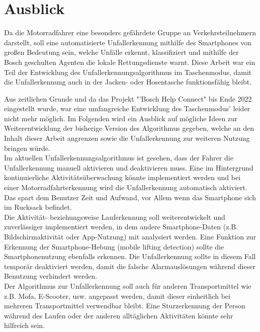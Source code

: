 \chapter{Ausblick}

Da die Motorradfahrer eine besonders gefährdete Gruppe an Verkehrsteilnehmern darstellt, soll eine automatisierte Unfallerkennung mithilfe des Smartphones von großen Bedeutung sein, welche Unfälle erkennt, klassifiziert und mithilfe der Bosch geschulten Agenten die lokale Rettungsdienste warnt. Diese Arbeit war ein Teil der Entwicklung des Unfallerkennungsalgorithmus im Taschenmodus, damit die Unfallerkennung auch in der Jacken- oder Hosentasche funktionsfähig bleibt.

Aus zeitlichen Grunde und da das Projekt "'Bosch Help Connect" bis Ende 2022 eingestellt wurde, war eine umfangreiche Entwicklung des Taschenmodus' leider nicht mehr möglich.
Im Folgenden wird ein Ausblick auf mögliche Ideen zur Weiterentwicklung der bisherige Version des Algorithmus gegeben, welche an den Inhalt dieser Arbeit angrenzen sowie die Unfallerkennung zur weiteren Nutzung bringen würde.\\

Im aktuellen Unfallerkennungsalgorithmus ist gesehen, dass der Fahrer die Unfallerkennung manuell aktivieren und deaktivieren muss. Eine im Hintergrund kontinuierliche Aktivitätsüberwachung könnte implementiert werden und bei einer Motorradfahrterkennung wird die Unfallerkennung automatisch aktiviert. Das spart dem Benutzer Zeit und Aufwand, vor Allem wenn das Smartphone sich im Rucksack befindet.\\ %

Die Aktivität- beziehungsweise Lauferkennung soll weiterentwickelt und zuverlässiger implementiert werden, in dem andere Smartphone-Daten (z.B. Bildschirmaktivität oder App-Nutzung) mit analysiert werden.
Eine Funktion zur Erkennung der Smartphone-Hebung (mobile lifting detection) sollte die Smartphonenutzung ebenfalls erkennen. Die Unfallerkennung sollte in diesem Fall temporär deaktiviert werden, damit die falsche Alarmauslösungen während dieser Benutzung verhindert werden.\\

Der Algorithmus zur Unfallerkennung soll auch für anderen Transportmittel wie z.B. Mofa, E-Scooter, usw. angepasst werden, damit dieser einheitlich bei mehreren Transportmittel verwendbar bleibt. Eine Sturzerkennung der Person während des Laufen oder der anderen alltäglichen Aktivitäten könnte sehr hilfreich sein.\\

